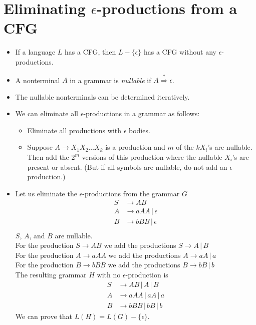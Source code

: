 \documentclass[]{article}
\begin{document}
\section{Eliminating $\epsilon$-productions from a CFG}
  \begin{itemize}
    \item If a language $L$ has a CFG, then $L - \{\epsilon\}$ has a CFG 
    without any $\epsilon$-productions.
    \item A nonterminal $A$ in a grammar is \emph{nullable} if $A \overset{*}
    {\Rightarrow} \epsilon$.
    \item The nullable nonterminals can be determined iteratively.
    \item We can eliminate all $\epsilon$-productions in a grammar as follows:
      \begin{itemize}
        \item Eliminate all productions with $\epsilon$ bodies.
        \item Suppose $A \rightarrow X_1X_2\ldots{}X_k$ is a production and $m$ 
        of the $kX_i$'s are nullable. Then add the $2^m$ versions of this 
        production where the nullable $X_i$'s are present or absent. (But if 
        all symbols are nullable, do not add an $\epsilon$-production.)
      \end{itemize}
    \item Let us eliminate the $\epsilon$-productions from the grammar $G$
      \begin{align*}
        S &\rightarrow AB \\
        A &\rightarrow aAA \, | \, \epsilon \\
        B &\rightarrow bBB \, | \, \epsilon \\
      \end{align*}
    $S$, $A$, and $B$ are nullable. \\
    For the production $S\rightarrow{AB}$ we add the productions $S
    \rightarrow{A} \, | \, B$ \\
    For the production $A\rightarrow{aAA}$ we add the productions $A
    \rightarrow{aA} \, | \, a$ \\
    For the production $B\rightarrow{bBB}$ we add the productions $B
    \rightarrow{bB} \, | \, b$ \\
    The resulting grammar $H$ with no $\epsilon$-production is
      \begin{align*}
        S &\rightarrow AB  \, | \,  A \, | \, B \\
        A &\rightarrow aAA \, | \, aA \, | \, a \\
        B &\rightarrow bBB \, | \, bB \, | \, b
      \end{align*}
    We can prove that $L(H) = L(G) - \{\epsilon\}$.
  \end{itemize}
\end{document}
